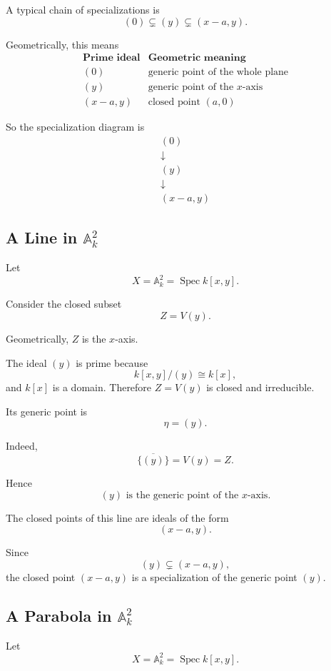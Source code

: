\documentclass[12pt,a4paper]{article}
\theoremstyle{notespace}
\begin{document}
A typical chain of specializations is
\[
(0)\subsetneq (y)\subsetneq (x-a,y).
\]

Geometrically, this means
\[
\begin{array}{c|c}
	\textbf{Prime ideal} & \textbf{Geometric meaning}
	\\
	\hline
	(0) & \text{generic point of the whole plane}
	\\
	(y) & \text{generic point of the }x\text{-axis}
	\\
	(x-a,y) & \text{closed point }(a,0)
\end{array}
\]

So the specialization diagram is
\[
\begin{array}{c}
	(0)
	\\[0.4em]
	\downarrow
	\\[0.4em]
	(y)
	\\[0.4em]
	\downarrow
	\\[0.4em]
	(x-a,y)
\end{array}
\]

\subsection{A Line in \(\mathbb A^2_k\)}

Let
\[
X=\mathbb A^2_k=\operatorname{Spec} k[x,y].
\]

Consider the closed subset
\[
Z=V(y).
\]

Geometrically, \(Z\) is the \(x\)-axis.

The ideal \((y)\) is prime because
\[
k[x,y]/(y)\cong k[x],
\]
and \(k[x]\) is a domain. Therefore \(Z=V(y)\) is closed and irreducible.

Its generic point is
\[
\eta=(y).
\]

Indeed,
\[
\overline{\{(y)\}}=V(y)=Z.
\]

Hence
\[
\boxed{(y)\text{ is the generic point of the }x\text{-axis}.}
\]

The closed points of this line are ideals of the form
\[
(x-a,y).
\]

Since
\[
(y)\subsetneq (x-a,y),
\]
the closed point \((x-a,y)\) is a specialization of the generic point \((y)\).

\subsection{A Parabola in \(\mathbb A^2_k\)}

Let
\[
X=\mathbb A^2_k=\operatorname{Spec} k[x,y].
\]
\end{document}
